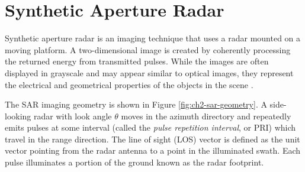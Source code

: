 \section{Synthetic Aperture Radar}
\label{sec:ch2-sar}


Synthetic aperture radar is an imaging technique that uses a radar mounted on a moving platform. A two-dimensional image is created by coherently processing the returned energy from transmitted pulses. While the images are often displayed in grayscale and may appear similar to optical images, they represent the electrical and geometrical properties of the objects in the scene \cite{Simons2007InterferometricSyntheticAperture}.


The SAR imaging geometry is shown in Figure \ref{fig:ch2-sar-geometry}. A side-looking radar with look angle $\theta$ moves in the azimuth directory and repeatedly emits pulses at some interval (called the \emph{pulse repetition interval}, or PRI) which travel in the range direction.
The line of sight (LOS) vector is defined as the unit vector pointing from the radar antenna to a point in the illuminated swath.
Each pulse illuminates a portion of the ground known as the radar footprint.


